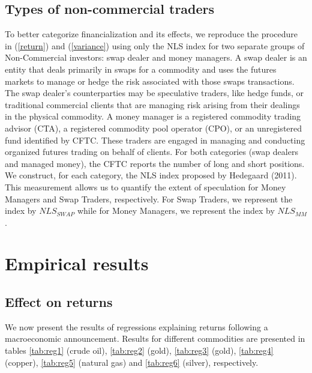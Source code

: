 \documentclass[12pt]{article}
\begin{document}
\subsection{Types of non-commercial traders}
To better categorize financialization and its effects, we reproduce the procedure in (\ref{return})  and (\ref{variance}) using only the NLS index for two separate groups of Non-Commercial investors: swap dealer and money managers. A swap dealer is an entity that deals primarily in swaps for a commodity and uses the futures markets to manage or hedge the risk associated with those swaps transactions. The swap dealer’s counterparties may be speculative traders, like hedge funds, or traditional commercial clients that are managing risk arising from their dealings in the physical commodity. A money manager is a registered commodity trading advisor (CTA), a registered commodity pool operator (CPO), or an unregistered fund identified by CFTC. These traders are engaged in managing and conducting organized futures trading on behalf of clients. For both categories (swap dealers and managed money), the CFTC reports the number of long and short positions. We construct, for each category, the NLS index proposed by Hedegaard (2011). This measurement allows us to quantify the extent of speculation for Money Managers and Swap Traders, respectively. For Swap Traders, we represent the index by $NLS_{SWAP}$ while for Money Managers, we represent the index by $NLS_{MM}$.

\section{Empirical results} \label{sec:result}

\subsection{Effect on returns}
We now present the results of regressions explaining returns following a macroeconomic announcement. Results for different commodities are presented in tables \ref{tab:reg1} (crude oil), \ref{tab:reg2} (gold), \ref{tab:reg3} (gold), \ref{tab:reg4} (copper), \ref{tab:reg5} (natural gas) and \ref{tab:reg6} (silver), respectively.
\end{document}
